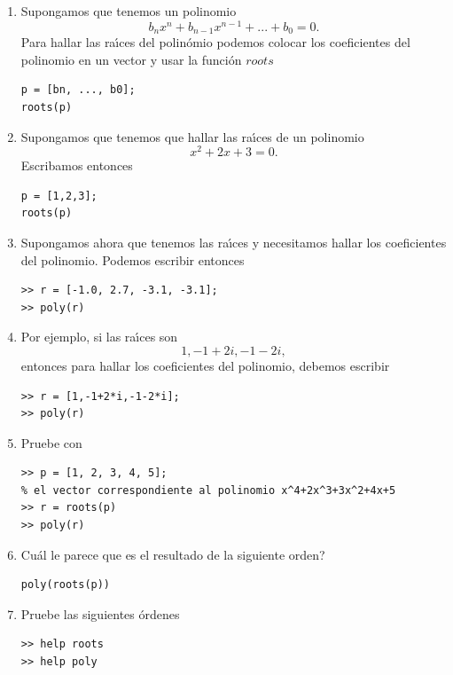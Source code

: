 \begin{enumerate}
\item Supongamos que tenemos un polinomio
\begin{equation}
  b_{n}x^{n}+b_{n-1}x^{n-1}+...+b_{0}=0.
\end{equation}
Para hallar las ra\'{\i}ces del polin\'{o}mio podemos colocar los
coeficientes del polinomio en un vector y usar la funci\'{o}n $roots$
\begin{verbatim}
p = [bn, ..., b0];
roots(p)
\end{verbatim}

\item Supongamos que tenemos que hallar las ra\'{\i}ces de un polinomio
\begin{equation}
  x^{2}+2x+3=0.
\end{equation}
Escribamos entonces
\begin{verbatim}
p = [1,2,3];
roots(p)
\end{verbatim}

\item Supongamos ahora que tenemos las ra\'{\i}ces y necesitamos hallar los
coeficientes del polinomio. Podemos escribir entonces
\begin{verbatim}
>> r = [-1.0, 2.7, -3.1, -3.1];
>> poly(r)
\end{verbatim}

\item Por ejemplo, si las ra\'{\i}ces son
\begin{equation}
  1,-1+2i,-1-2i,
\end{equation}
entonces para hallar los coeficientes del polinomio, debemos escribir
\begin{verbatim}
>> r = [1,-1+2*i,-1-2*i];
>> poly(r)
\end{verbatim}

\item Pruebe con
\begin{verbatim}
>> p = [1, 2, 3, 4, 5];
% el vector correspondiente al polinomio x^4+2x^3+3x^2+4x+5
>> r = roots(p)
>> poly(r)
\end{verbatim}

\item \textquestiondown Cu\'{a}l le parece que es el resultado de la
siguiente orden?
\begin{verbatim}
poly(roots(p))
\end{verbatim}

\item Pruebe las siguientes \'{o}rdenes
\begin{verbatim}
>> help roots
>> help poly
\end{verbatim}

\end{enumerate}

